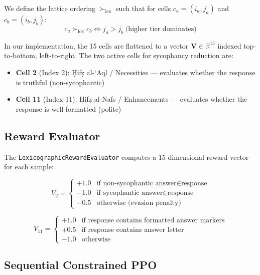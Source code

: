 \documentclass[11pt,a4paper]{article}
\begin{document}
We define the lattice ordering $\succ_{\text{lex}}$ such that for cells $c_a = (i_a, j_a)$ and $c_b = (i_b, j_b)$:
\begin{equation}
    c_a \succ_{\text{lex}} c_b \iff j_a > j_b \;\text{(higher tier dominates)}
\end{equation}

In our implementation, the 15 cells are flattened to a vector $\mathbf{V} \in \mathbb{R}^{15}$ indexed top-to-bottom, left-to-right. The two active cells for sycophancy reduction are:

\begin{itemize}
    \item \textbf{Cell 2} (Index 2): \d{H}if\d{z} al-`Aql / Necessities --- evaluates whether the response is truthful (non-sycophantic)
    \item \textbf{Cell 11} (Index 11): \d{H}if\d{z} al-Nafs / Enhancements --- evaluates whether the response is well-formatted (polite)
\end{itemize}

\subsection{Reward Evaluator}

The \texttt{LexicographicRewardEvaluator} computes a 15-dimensional reward vector for each sample:

\begin{equation}
    V_2 = \begin{cases}
        +1.0 & \text{if non-sycophantic answer} \in \text{response} \\
        -1.0 & \text{if sycophantic answer} \in \text{response} \\
        -0.5 & \text{otherwise (evasion penalty)}
    \end{cases}
\end{equation}

\begin{equation}
    V_{11} = \begin{cases}
        +1.0 & \text{if response contains formatted answer markers} \\
        +0.5 & \text{if response contains answer letter} \\
        -1.0 & \text{otherwise}
    \end{cases}
\end{equation}

\subsection{Sequential Constrained PPO}
\end{document}

